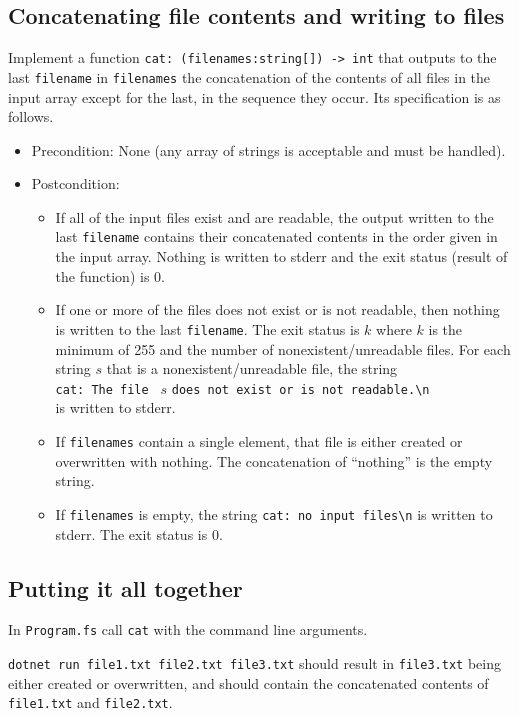 \subsection*{Concatenating file contents and writing to files}

Implement a function \texttt{cat: (filenames:string[]) -> int} that outputs to the last \texttt{filename} in \texttt{filenames} the concatenation of the contents of all files in the input array except for the last, in the sequence they occur. Its specification is as follows.
\begin{itemize}
\item Precondition: None (any array of strings is acceptable and must be handled).
\item Postcondition: 
\begin{itemize}
\item If all of the input files exist and are readable, the output written to the last \texttt{filename} contains their concatenated contents in the order given in the input array. Nothing is written to stderr and the exit status (result of the function) is $0$.
\item If one or more of the files does not exist or is not readable, then
  nothing is written to the last \texttt{filename}. The exit status is $k$ where $k$ is the minimum of 255 and the number of nonexistent/unreadable files. For each string $s$ that is a nonexistent/unreadable file, the string \\ \verb|cat: The file | $s$ \verb|does not exist or is not readable.\n| \\ is written to stderr.
\item If \texttt{filenames} contain a single element, that file is either created or overwritten with nothing. The concatenation of ``nothing'' is the empty string.
  \item If \texttt{filenames} is empty, the string \verb|cat: no input files\n| is written to stderr. The exit status is 0. 
\end{itemize}
\end{itemize} 

\subsection*{Putting it all together}

In \texttt{Program.fs} call \texttt{cat} with the command line arguments.

\texttt{dotnet run file1.txt file2.txt file3.txt} should result in \texttt{file3.txt} being either created or overwritten, and should contain the concatenated contents of \texttt{file1.txt} and \texttt{file2.txt}.

